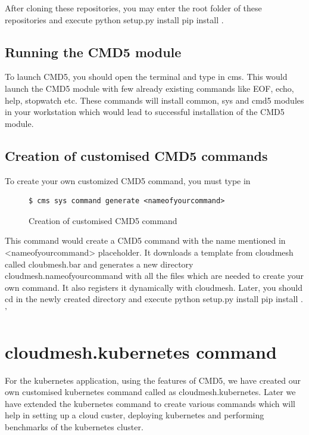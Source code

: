 \documentclass[9pt,twocolumn,twoside]{../../styles/osajnl}
\begin{document}
After cloning these repositories, you may enter the root folder of
these repositories and execute
\newline
python setup.py install \newline
pip install .

\subsection{Running the CMD5 module}
To launch CMD5, you should open the terminal and type in cms.  This
would launch the CMD5 module with few already existing commands like
EOF, echo, help, stopwatch etc.
These commands will install common, sys and cmd5 modules in your
workstation which would lead to successful installation of the CMD5
module.

\subsection{Creation of customised CMD5 commands}
To create your own customized CMD5 command, you must type in 

\begin{figure}[H]
\begin{verbatim}
$ cms sys command generate <nameofyourcommand>
\end{verbatim}
\caption{Creation of customised CMD5 command}
\label{Creation of customised CMD5 command}
\end{figure}

This command would create a CMD5 command with the name mentioned in
<nameofyourcommand> placeholder. It downloads a template from
cloudmesh called cloubmesh.bar and generates a new directory
cloudmesh.nameofyourcommand with all the files which are needed to
create your own command. It also registers it dynamically with cloudmesh.
Later, you should cd in the newly created directory and execute \newline
python setup.py install \newline
pip install . \newline'

\section{cloudmesh.kubernetes command}
For the kubernetes application, using the features of CMD5, we have
created our own customised kubernetes command called as
cloudmesh.kubernetes. Later we have extended the kubernetes command to
create various commands which will help in setting up a cloud custer,
deploying kubernetes and performing benchmarks of the kubernetes
cluster.
\end{document}
